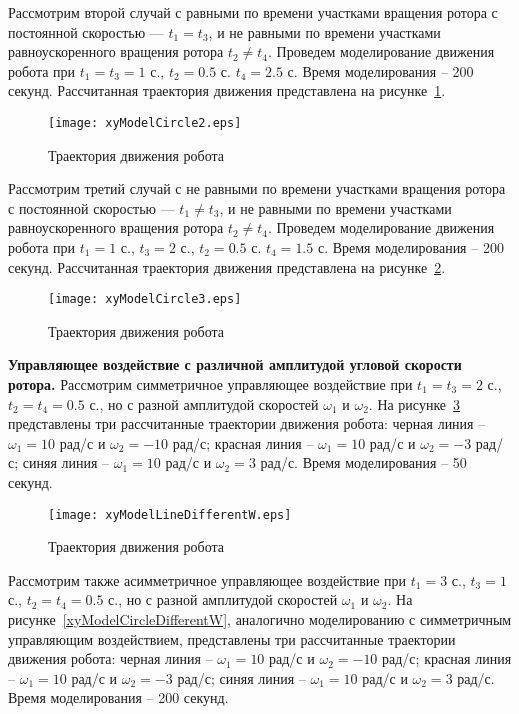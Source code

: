 Рассмотрим второй случай с равными по времени участками вращения ротора с постоянной скоростью --- $t_1 = t_3$, и не равными по времени участками равноускоренного вращения ротора $t_2 \neq t_4$. Проведем моделирование движения робота при $t_1=t_3=1$ с., $t_2=0.5$ с. $t_4 = 2.5$ с. Время моделирования -- 200 секунд. Рассчитанная траектория движения представлена на рисунке~\ref{xyModelCircle2}.

\begin{figure}[!ht]
	\centering
	\texttt{[image: xyModelCircle2.eps]}
	\caption{Траектория движения робота}
	\label{xyModelCircle2}
\end{figure}

Рассмотрим третий случай с не равными по времени участками вращения ротора с постоянной скоростью --- $t_1 \neq t_3$, и не равными по времени участками равноускоренного вращения ротора $t_2 \neq t_4$. Проведем моделирование движения робота при $t_1=1$ с., $t_3=2$ с., $t_2=0.5$ с. $t_4 = 1.5$ с. Время моделирования -- 200 секунд. Рассчитанная траектория движения представлена на рисунке~\ref{xyModelCircle3}.

\begin{figure}[!ht]
	\centering
	\texttt{[image: xyModelCircle3.eps]}
	\caption{Траектория движения робота}
	\label{xyModelCircle3}
\end{figure}

\textbf{Управляющее воздействие с различной амплитудой угловой скорости ротора.} Рассмотрим симметричное управляющее воздействие при $t_1=t_3=2$ с., $t_2=t_4 = 0.5$ с., но с разной амплитудой скоростей $\omega_1$ и $\omega_2$.  На рисунке~\ref{xyModelLineDifferentW} представлены три рассчитанные траектории движения робота: черная линия -- $\omega_1=10$ рад/с и $\omega_2=-10$ рад/с; красная линия -- $\omega_1=10$ рад/с и $\omega_2=-3$ рад/с; синяя линия -- $\omega_1=10$ рад/с и $\omega_2=3$ рад/с. Время моделирования -- 50 секунд.

\begin{figure}[!ht]
	\centering
	\texttt{[image: xyModelLineDifferentW.eps]}
	\caption{Траектория движения робота }
	\label{xyModelLineDifferentW}
\end{figure}

Рассмотрим также асимметричное управляющее воздействие при $t_1=3$ с., $t_3=1$ с., $t_2=t_4 = 0.5$ с., но с разной амплитудой скоростей $\omega_1$ и $\omega_2$. На рисунке~\ref{xyModelCircleDifferentW}, аналогично моделированию с симметричным управляющим воздействием, представлены три рассчитанные траектории движения робота: черная линия -- $\omega_1=10$ рад/с и $\omega_2=-10$ рад/с; красная линия -- $\omega_1=10$ рад/с и $\omega_2=-3$ рад/с; синяя линия -- $\omega_1=10$ рад/с и $\omega_2=3$ рад/с. Время моделирования -- 200 секунд.

